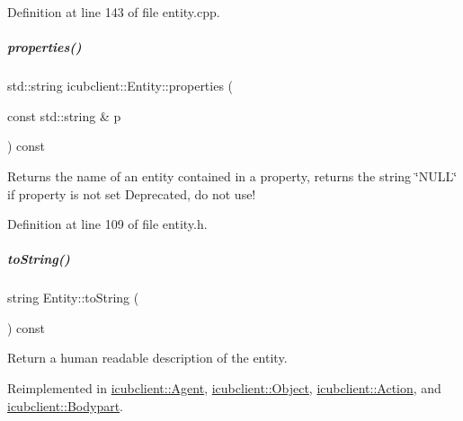 Definition at line 143 of file entity.\+cpp.

\mbox{\label{group__icubclient__representations_a070b4a41c396c3740e5aec8a861436a6}} 
\subparagraph{\texorpdfstring{properties()}{properties()}}
{\footnotesize\ttfamily std\+::string icubclient\+::\+Entity\+::properties (\begin{DoxyParamCaption}\item[{const std\+::string \&}]{p }\end{DoxyParamCaption}) const\hspace{0.3cm}{\ttfamily [inline]}}



Returns the name of an entity contained in a property, returns the string \char`\"{}\+N\+U\+L\+L\char`\"{} if property is not set Deprecated, do not use! 



Definition at line 109 of file entity.\+h.

\mbox{\label{group__icubclient__representations_ad578a93701121f00ac7079fafad6c0e1}} 
\subparagraph{\texorpdfstring{to\+String()}{toString()}}
{\footnotesize\ttfamily string Entity\+::to\+String (\begin{DoxyParamCaption}{ }\end{DoxyParamCaption}) const\hspace{0.3cm}{\ttfamily [virtual]}}



Return a human readable description of the entity. 



Reimplemented in \hyperlink{group__icubclient__representations_a1fbd9d1acccac0b9fb5a6a1dce6f44f9}{icubclient\+::\+Agent}, \hyperlink{group__icubclient__representations_aef5180c43e05c572865ad38ff650b930}{icubclient\+::\+Object}, \hyperlink{group__icubclient__representations_a725d45d77d48e73135956e1aadfe3889}{icubclient\+::\+Action}, and \hyperlink{group__icubclient__representations_ac14830acd5adc122c5caeb91947b9ca1}{icubclient\+::\+Bodypart}.



